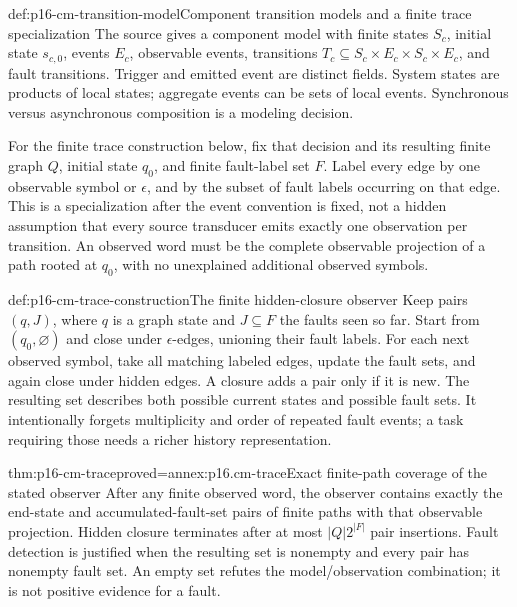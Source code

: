 \begin{hbdefinition}{def:p16-cm-transition-model}{Component transition models and a finite trace specialization}
The source gives a component model with finite states \(S_c\), initial
state \(s_{c,0}\), events \(E_c\), observable events, transitions
\(T_c\subseteq S_c\times E_c\times S_c\times E_c\), and fault
transitions. Trigger and emitted event are distinct fields. System states
are products of local states; aggregate events can be sets of local events.
Synchronous versus asynchronous composition is a modeling decision.

For the finite trace construction below, fix that decision and its resulting
finite graph \(Q\), initial state \(q_0\), and finite fault-label set
\(F\). Label every edge by one observable symbol or \(\epsilon\),
and by the subset of fault labels occurring on that edge. This is a
specialization after the event convention is fixed, not a hidden assumption
that every source transducer emits exactly one observation per transition.
An observed word must be the complete observable projection of a path rooted
at \(q_0\), with no unexplained additional observed symbols.
\end{hbdefinition}

\begin{hbmethod}{def:p16-cm-trace-construction}{The finite hidden-closure observer}
Keep pairs \((q,J)\), where \(q\) is a graph state and \(J\subseteq F\)
the faults seen so far. Start from \((q_0,\varnothing)\) and close under
\(\epsilon\)-edges, unioning their fault labels. For each next observed
symbol, take all matching labeled edges, update the fault sets, and again
close under hidden edges. A closure adds a pair only if it is new.
The resulting set describes both possible current states and possible
fault sets. It intentionally forgets multiplicity and order of repeated
fault events; a task requiring those needs a richer history representation.
\end{hbmethod}

\begin{hbtheorem}{thm:p16-cm-trace}{proved=annex:p16.cm-trace}{Exact finite-path coverage of the stated observer}
After any finite observed word, the observer contains exactly the end-state
and accumulated-fault-set pairs of finite paths with that observable
projection. Hidden closure terminates after at most \(|Q|2^{|F|}\)
pair insertions. Fault detection is justified when the resulting set is
nonempty and every pair has nonempty fault set. An empty set refutes the
model/observation combination; it is not positive evidence for a fault.
\end{hbtheorem}


